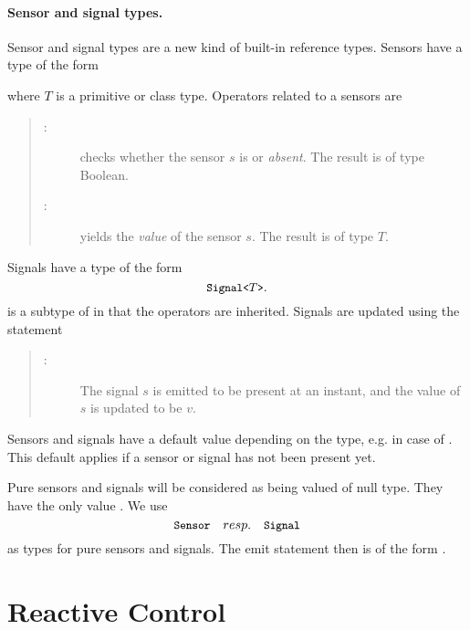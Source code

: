 \paragraph{Sensor and signal types.}
Sensor and signal types are a new kind of built-in reference types. Sensors
 have a type of the form
\begin{center}
\end{center}
where $T$ is a primitive or class type. Operators related to
a sensors are
\begin{quote}
\begin{description}
	  \item[ :] checks whether the sensor $s$ is 
	   or \emph{absent}. 
	  The result is of type Boolean.

	  \item[ :]\index{\pp{\$}} yields the \emph{value} of the sensor $s$. 
	  The result is of type $T$.	
\end{description}
\end{quote}
Signals have a type of the form
   $$\texttt{\small{Signal<$T$>}}.$$
 is a subtype of  in that the 
 operators are inherited. Signals are updated
using the statement
\begin{quote}
  \begin{description}
	  \item[ :] The signal $s$ is emitted to be present
	  at an instant, and the value of $s$ is updated to be $v$.
  \end{description}
\end{quote}
Sensors and signals have a default value
 depending on the type, e.g.
 in case of . This default applies if a sensor or signal has 
not been present yet.

Pure sensors and signals will be considered as being valued of null type.
They have the only value . We use 
$$\texttt{\small{Sensor}}\quad resp.\quad \texttt{\small{Signal}}$$ 
as types for pure sensors and signals.
The emit statement then is of the form .

\section{Reactive Control}\label{reactive-control}


